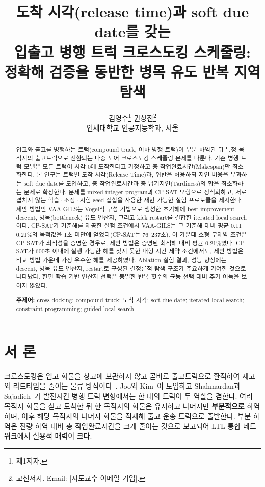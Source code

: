 \documentclass[10pt,a4paper]{article}
\title{\vspace{-8mm}\textbf{도착 시각(release time)과 soft due date를 갖는\\
입출고 병행 트럭 크로스도킹 스케줄링:\\
정확해 검증을 동반한 병목 유도 반복 지역탐색}}
\author{김영수\thanks{제1저자.} \quad 권상진\thanks{교신저자. Email: [지도교수 이메일 기입].}\\
\small 연세대학교 인공지능학과, 서울}
\date{}
\begin{document}
\maketitle
\vspace{-4mm}

\begin{abstract}
\noindent
입고와 출고를 병행하는 트럭(compound truck, 이하 병행 트럭)이 부분 하역된 뒤 특정 목적지의 출고트럭으로
전환되는 다중 도어 크로스도킹 스케줄링 문제를 다룬다. 기존 병행 트럭 모델은
모든 트럭이 시각 0에 도착한다고 가정하고 총 작업완료시간(Makespan)만 최소화한다.
본 연구는 트럭별 도착 시각(Release Time)과, 위반을 허용하되 지연 비용을 부과하는
soft due date를 도입하고, 총 작업완료시간과 총 납기지연(Tardiness)의 합을 최소화하는
문제로 확장한다. 문제를 mixed-integer program과 CP-SAT 모형으로 정식화하고, 서로
겹치지 않는 학습·조정·시험 seed 집합을 사용한 재현 가능한 실험 프로토콜을
제시한다. 제안 방법인 VAA-GILS는 Vogel식 구성 기법으로 생성한 초기해에
best-improvement descent, 병목(bottleneck) 유도 연산자, 그리고 kick restart를
결합한 iterated local search이다. CP-SAT가 기준해를 제공한 실험 조건에서
VAA-GILS는 그 기준해 대비 평균 0.11--0.21\%의 목적값을 1초 미만에 얻었다(CP-SAT는
76--237초). 이 가운데 소형 무제약 조건은 CP-SAT가 최적성을 증명한 경우로, 제안
방법은 증명된 최적해 대비 평균 0.21\%였다. CP-SAT가 600초 이내에 실행 가능한 해를
찾지 못한 대형 시간 제약 조건에서도, 제안 방법은 비교 방법 가운데 가장 우수한 해를
제공하였다. Ablation 실험 결과, 성능 향상에는 descent, 병목 유도 연산자, restart로
구성된 결정론적 탐색 구조가 주요하게 기여한 것으로 나타났다. 한편 학습 기반 연산자
선택은 동일한 반복 횟수의 균등 선택 대비 추가 이득을 보이지 않았다.

\smallskip
\noindent\textbf{주제어:} cross-docking; compound truck; 도착 시각; soft due date;
iterated local search; constraint programming; guided local search
\end{abstract}

\section{서 론}

크로스도킹은 입고 화물을 창고에 보관하지 않고 곧바로 출고트럭으로 환적하여
재고와 리드타임을 줄이는 물류 방식이다~\cite{boysen2010,vanbelle2012}. Joo와
Kim~\cite{joo2013}이 도입하고 Shahmardan과 Sajadieh~\cite{shahmardan2020}가
발전시킨 병행 트럭 변형에서는 한 대의 트럭이 두 역할을 겸한다. 여러 목적지
화물을 싣고 도착한 뒤 한 목적지의 화물은 유지하고 나머지만 \textbf{부분적으로} 하역하며,
이후 해당 목적지의 나머지 화물을 적재해 출고 운송 트럭으로 출발한다. 부분 하역은 전량 하역 대비
총 작업완료시간을 크게 줄이는 것으로 보고되어 LTL 통합 네트워크에서 실용적 매력이 크다.
\end{document}
